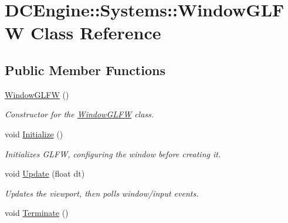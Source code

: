 \hypertarget{classDCEngine_1_1Systems_1_1WindowGLFW}{\section{D\-C\-Engine\-:\-:Systems\-:\-:Window\-G\-L\-F\-W Class Reference}
\label{classDCEngine_1_1Systems_1_1WindowGLFW}
}
\subsection*{Public Member Functions}
\begin{DoxyCompactItemize}
\item 
\hypertarget{classDCEngine_1_1Systems_1_1WindowGLFW_a31c2b6c1fd1eedebebbd46e93a25fa78}{\hyperlink{classDCEngine_1_1Systems_1_1WindowGLFW_a31c2b6c1fd1eedebebbd46e93a25fa78}{Window\-G\-L\-F\-W} ()}\label{classDCEngine_1_1Systems_1_1WindowGLFW_a31c2b6c1fd1eedebebbd46e93a25fa78}

\begin{DoxyCompactList}\small\item\em Constructor for the \hyperlink{classDCEngine_1_1Systems_1_1WindowGLFW}{Window\-G\-L\-F\-W} class. \end{DoxyCompactList}\item 
\hypertarget{classDCEngine_1_1Systems_1_1WindowGLFW_ac7ae83e32fa53469db47d007725491f7}{void \hyperlink{classDCEngine_1_1Systems_1_1WindowGLFW_ac7ae83e32fa53469db47d007725491f7}{Initialize} ()}\label{classDCEngine_1_1Systems_1_1WindowGLFW_ac7ae83e32fa53469db47d007725491f7}

\begin{DoxyCompactList}\small\item\em Initializes G\-L\-F\-W, configuring the window before creating it. \end{DoxyCompactList}\item 
\hypertarget{classDCEngine_1_1Systems_1_1WindowGLFW_aacb64154bec4046bb18105a886e140af}{void \hyperlink{classDCEngine_1_1Systems_1_1WindowGLFW_aacb64154bec4046bb18105a886e140af}{Update} (float dt)}\label{classDCEngine_1_1Systems_1_1WindowGLFW_aacb64154bec4046bb18105a886e140af}

\begin{DoxyCompactList}\small\item\em Updates the viewport, then polls window/input events. \end{DoxyCompactList}\item 
\hypertarget{classDCEngine_1_1Systems_1_1WindowGLFW_abeadd8d68952d364d9753b3b05941e83}{void \hyperlink{classDCEngine_1_1Systems_1_1WindowGLFW_abeadd8d68952d364d9753b3b05941e83}{Terminate} ()}\label{classDCEngine_1_1Systems_1_1WindowGLFW_abeadd8d68952d364d9753b3b05941e83}


\end{DoxyCompactItemize}
